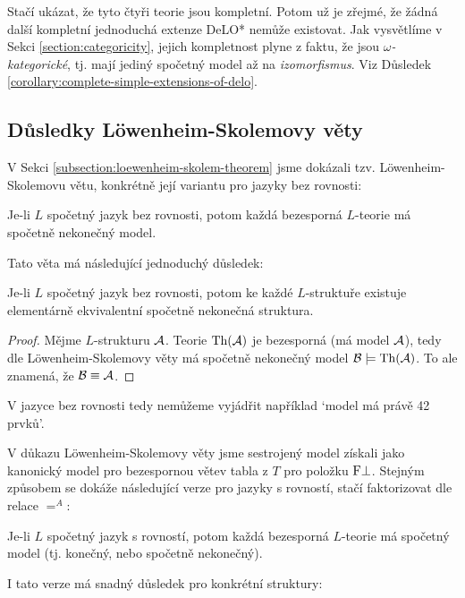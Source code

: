 Stačí ukázat, že tyto čtyři teorie jsou kompletní. Potom už je zřejmé, že žádná další kompletní jednoduchá extenze DeLO* nemůže existovat. Jak vysvětlíme v Sekci \ref{section:categoricity}, jejich kompletnost plyne z faktu, že jsou \emph{$\omega$-kategorické}, tj. mají jediný spočetný model až na \emph{izomorfismus}. Viz Důsledek \ref{corollary:complete-simple-extensions-of-delo}.


\subsection{Důsledky Löwenheim-Skolemovy věty}

V Sekci \ref{subsection:loewenheim-skolem-theorem} jsme dokázali tzv. Löwenheim-Skolemovu větu, konkrétně její variantu pro jazyky bez rovnosti:

\begin{theorem-unnumbered}
    Je-li $L$ spočetný jazyk bez rovnosti, potom každá bezesporná $L$-teorie má spočetně nekonečný model.
\end{theorem-unnumbered}

Tato věta má následující jednoduchý důsledek:

\begin{corollary}\label{corollary:loewenheim-skolem-without-equality}
    Je-li $L$ spočetný jazyk bez rovnosti, potom ke každé $L$-struktuře existuje elementárně ekvivalentní spočetně nekonečná struktura.
\end{corollary}
\begin{proof}
    Mějme $L$-strukturu $\mathcal{A}$. Teorie $\operatorname{Th}(\mathcal{A})$ je bezesporná (má model $\mathcal{A}$), tedy dle Löwenheim-Skolemovy věty má spočetně nekonečný model $\mathcal{B}\models\operatorname{Th}(\mathcal{A})$. To ale znamená, že $\mathcal{B}\equiv\mathcal{A}$.
\end{proof}
V jazyce bez rovnosti tedy nemůžeme vyjádřit například `model má právě 42 prvků'.

V důkazu Löwenheim-Skolemovy věty jsme sestrojený model získali jako kanonický model pro bezespornou větev tabla z $T$ pro položku $\mathrm{F}\bot$. Stejným způsobem se dokáže následující verze pro jazyky s rovností, stačí faktorizovat dle relace $=^A$:

\begin{theorem-unnumbered}
    Je-li $L$ spočetný jazyk s rovností, potom každá bezesporná $L$-teorie má spočetný model (tj. konečný, nebo spočetně nekonečný).
\end{theorem-unnumbered}

I tato verze má snadný důsledek pro konkrétní struktury:

